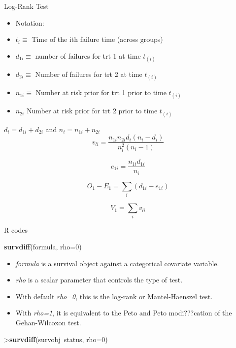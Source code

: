 \documentclass[ignorenonframetext,]{beamer}
\newenvironment{Shaded}{\begin{snugshade}}{\end{snugshade}}
\newcommand{\KeywordTok}[1]{\textcolor[rgb]{0.13,0.29,0.53}{\textbf{{#1}}}}
\newcommand{\DataTypeTok}[1]{\textcolor[rgb]{0.13,0.29,0.53}{{#1}}}
\newcommand{\DecValTok}[1]{\textcolor[rgb]{0.00,0.00,0.81}{{#1}}}
\newcommand{\NormalTok}[1]{{#1}}
\begin{document}
\begin{frame}{Log-Rank Test}

\begin{itemize}
\itemsep1pt\parskip0pt
\item
  Notation:
\item
  \(t_{i} \equiv\) Time of the ith failure time (across groups)
\item
  \(d_{1i} \equiv\) number of failures for trt 1 at time \(t_{(i)}\)
\item
  \(d_{2i} \equiv\) Number of failures for trt 2 at time \(t_{(i)}\)
\item
  \(n_{1i} \equiv\) Number at risk prior for trt 1 prior to time
  \(t_{(i)}\)
\item
  \(n_{2i}\) Number at risk prior for trt 2 prior to time \(t_{(i)}\)
\end{itemize}

\(d_i = d_{1i}+ d_{2i}\) and \(n_i=n_{1i}+n_{2i}\) \[
v_{li} =\frac{ n_{1i}n_{2i}d_i(n_i-d_i) }{n_{i}^{2} (n_i-1)}
\]

\[
e_{1i} = \frac {n_{1i} d_{1i}}{n_i}
\]

\[
O_1-E_1 =\sum_i (d_{1i}-e_{1i})
\]

\[
V_1=\sum_i v_{li}
\]

\end{frame}

\begin{frame}[fragile]{R codes}

\begin{Shaded}
\begin{Highlighting}[]
\KeywordTok{survdiff}\NormalTok{(formula, }\DataTypeTok{rho=}\DecValTok{0}\NormalTok{)}
\end{Highlighting}
\end{Shaded}

\begin{itemize}
\itemsep1pt\parskip0pt
\item
  \emph{formula} is a survival object against a categorical covariate
  variable.
\item
  \emph{rho} is a scalar parameter that controls the type of test.
\item
  With default \emph{rho=0}, this is the log-rank or Mantel-Haenszel
  test.
\item
  With \emph{rho=1}, it is equivalent to the Peto and Peto modi???cation
  of the Gehan-Wilcoxon test.
\end{itemize}

\begin{Shaded}
\begin{Highlighting}[]
  \NormalTok{>}\KeywordTok{survdiff}\NormalTok{(survobj~status, }\DataTypeTok{rho=}\DecValTok{0}\NormalTok{)}
\end{Highlighting}
\end{Shaded}

\end{frame}
\end{document}
